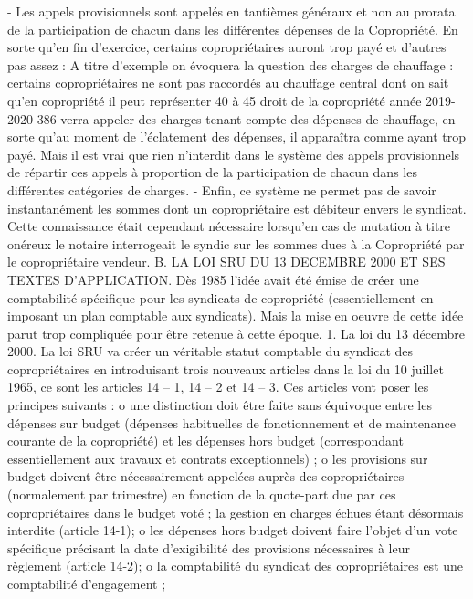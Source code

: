 - Les appels provisionnels sont appelés en tantièmes généraux et non au prorata de la participation de chacun dans les différentes dépenses de la Copropriété. En sorte qu'en fin d'exercice, certains copropriétaires auront trop payé et d'autres pas assez :
A titre d'exemple on évoquera la question des charges de chauffage : certains copropriétaires ne sont pas raccordés au chauffage central dont on sait qu'en copropriété il peut représenter 40 à 45 %
droit de la copropriété année 2019-2020
386
verra appeler des charges tenant compte des dépenses de chauffage, en sorte qu'au moment de l'éclatement des dépenses, il apparaîtra comme ayant trop payé.
Mais il est vrai que rien n'interdit dans le système des appels provisionnels de répartir ces appels à proportion de la participation de chacun dans les différentes catégories de charges.
- Enfin, ce système ne permet pas de savoir instantanément les sommes dont un copropriétaire est débiteur envers le syndicat. Cette connaissance était cependant nécessaire lorsqu'en cas de mutation à titre onéreux le notaire interrogeait le syndic sur les sommes dues à la Copropriété par le copropriétaire vendeur.
B. LA LOI SRU DU 13 DECEMBRE 2000 ET SES TEXTES D'APPLICATION.
Dès 1985 l’idée avait été émise de créer une comptabilité spécifique pour les syndicats de copropriété (essentiellement en imposant un plan comptable aux syndicats). Mais la mise en oeuvre de cette idée parut trop compliquée pour être retenue à cette époque.
1. La loi du 13 décembre 2000.
La loi SRU va créer un véritable statut comptable du syndicat des copropriétaires en introduisant trois nouveaux articles dans la loi du 10 juillet 1965, ce sont les articles 14 – 1, 14 – 2 et 14 – 3.
Ces articles vont poser les principes suivants :
o une distinction doit être faite sans équivoque entre les dépenses sur budget (dépenses habituelles de fonctionnement et de maintenance courante de la copropriété) et les dépenses hors budget (correspondant essentiellement aux travaux et contrats exceptionnels) ;
o les provisions sur budget doivent être nécessairement appelées auprès des copropriétaires (normalement par trimestre) en fonction de la quote-part due par ces copropriétaires dans le budget voté ; la gestion en charges échues étant désormais interdite (article 14-1);
o les dépenses hors budget doivent faire l'objet d'un vote spécifique précisant la date d'exigibilité des provisions nécessaires à leur règlement (article 14-2);
o la comptabilité du syndicat des copropriétaires est une comptabilité d'engagement ;
